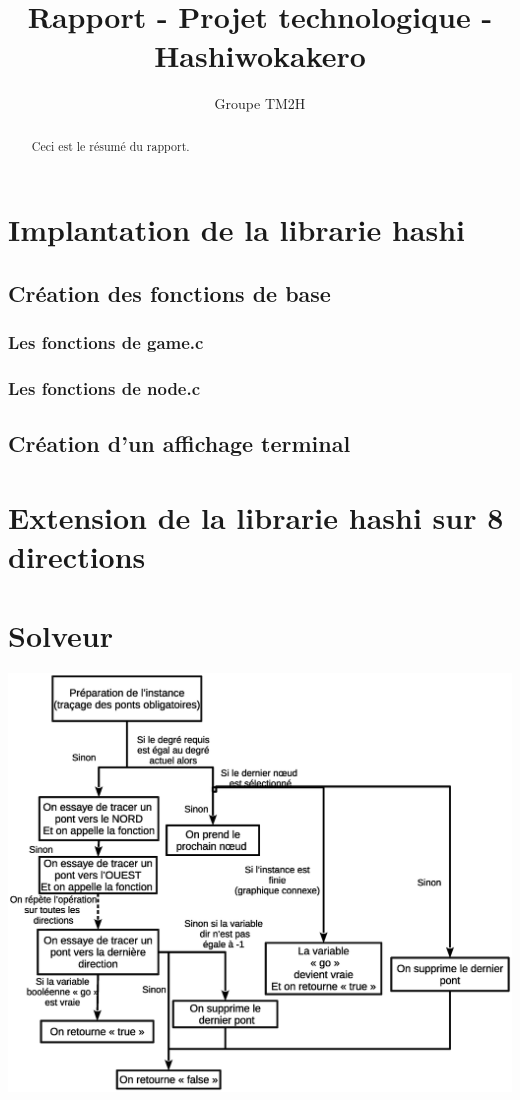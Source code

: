 \documentclass[12pt]{report}
\title{Rapport - Projet technologique - Hashiwokakero}
\author{Groupe TM2H}
\begin{document}
\maketitle

\begin{abstract}
Ceci est le résumé du rapport.
\end{abstract}

\tableofcontents

\section{Implantation de la librarie hashi}

\subsection{Création des fonctions de base}

\subsubsection{Les fonctions de game.c}

\subsubsection{Les fonctions de node.c}

\subsection{Création d'un affichage terminal}
\section{Extension de la librarie hashi sur 8 directions}
\newpage
\section{Solveur}

\includegraphics[width = 1.00\textwidth]{explication_solveur.eps}
\end{document}
